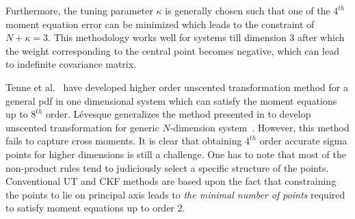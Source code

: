 \documentclass[letterpaper, 10 pt, conference]{IEEEtran}  %
\begin{document}
Furthermore, the tuning parameter $\kappa$ is generally chosen such that one of the $4^{th}$ moment equation error can be minimized which leads to the constraint of $N+\kappa=3$. %
This methodology works well for systems till dimension 3 after which the weight corresponding to the central point becomes negative, which can lead to indefinite covariance matrix. 

Tenne et al.~\cite{dirk} have developed higher order unscented transformation method for a general pdf in one dimensional system which can satisfy the moment equations up to $8^{th}$ order. L\'{e}vesque generalizes the method presented in \cite{dirk} to develop unscented transformation for generic $N$-dimension system~\cite{leves}. However, this method fails to capture cross moments. 
It is clear that obtaining $4^{th}$ order accurate sigma points for higher dimensions is still a challenge. One has to note that most of the non-product rules tend to judiciously select a specific structure of the points. Conventional UT and CKF methods are based upon the fact that constraining the points to lie on principal axis leads to \emph{the minimal number of points} required to satisfy moment equations up to order 2.


\end{document}
